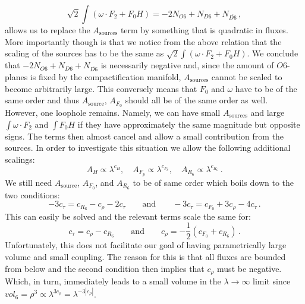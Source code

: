 \documentclass[a4paper,12pt]{report}
\newcommand{\be}{\begin{equation}}
\newcommand{\ee}{\end{equation}}
\begin{document}
\be 
\sqrt{2} \int \left( \omega \cdot F_2 + F_0 H\right) = -2 N_{O6} + N_{D6} + N_{\overline{D6}}\,,
\ee
allows us to replace the $A_{\text{sources}}$ term by something that is quadratic in fluxes. More importantly though is that we notice from the above relation that the scaling of the sources has to be the same as $\sqrt{2} \int \left( \omega \cdot F_2 + F_0 H\right)$. We conclude that $-2 N_{O6} + N_{D6} + N_{\overline{D6}}$ is necessarily negative and, since the amount of $O6$-planes is fixed by the compactification manifold, $A_{\text{sources}}$ cannot be scaled to become arbitrarily large. This conversely means that $F_0$ and $\omega$ have to be of the same order and thus $A_{\text{source}}$, $A_{F_0}$ should all be of the same order as well.\\
However, one loophole remains. Namely, we can have small $A_{\text{sources}}$ and large $\int \omega \cdot F_2$ and $\int F_0 H$ if they have approximately the same magnitude but opposite signs. The terms then almost cancel and allow a small contribution from the sources. In order to investigate this situation we allow the following additional scalings:
\be 
A_H \propto \lambda^ {c_H}, \quad A_{F_p} \propto \lambda^ {c_{F_p}},\quad A_{R_6} \propto \lambda^ {c_{R_6}}\,.
\ee
We still need $A_{\text{source}}$, $A_{F_0}$, and $A_{R_6}$ to be of same order which boils down to the two conditions:
\be 
-3 c_\tau = c_{R_6} - c_\rho - 2 c_\tau \qquad \text{and} \qquad -3c_\tau = c_{F_0} + 3 c_\rho - 4 c_\tau\,.
\ee
This can easily be solved and the relevant terms scale the same for:
\be 
c_\tau = c_\rho - c_{R_6} \qquad \text{and} \qquad c_\rho = -\frac{1}{2} \left( c_{F_0} + c_{R_6} \right)\,.
\ee
Unfortunately, this does not facilitate our goal of having parametrically large volume and small coupling. The reason for this is that all fluxes are bounded from below and the second condition then implies that $c_\rho$ must be negative. Which, in turn, immediately leads to a small volume in the $\lambda \to \infty$ limit since $vol_6 = \rho^ 3 \propto \lambda^ {3 c_\rho} = \lambda^ {-3 |c_\rho|}$.\\
\end{document}
